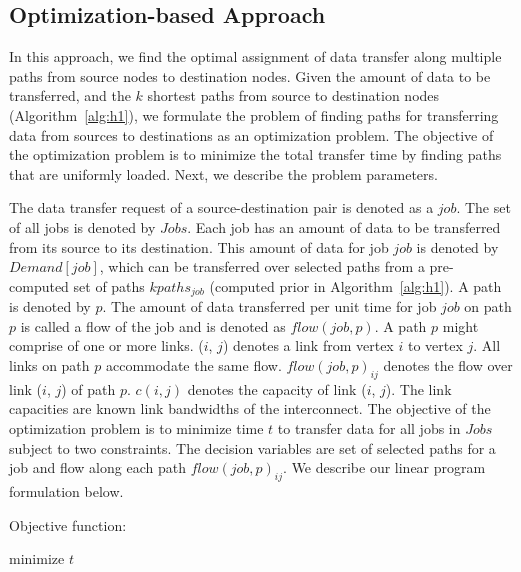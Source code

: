 \subsection{Optimization-based Approach}
\label{sec:optimization}

In this approach, we find the optimal assignment of data transfer along multiple paths from source nodes to destination nodes. Given the amount of data to be transferred, and the $k$ shortest paths from source to destination nodes (Algorithm~\ref{alg:h1}), we formulate the problem of finding paths for transferring data from sources to destinations as an optimization problem. The objective of the optimization problem is to minimize the total transfer time by finding paths that are uniformly loaded. Next, we describe the problem parameters.

The data transfer request of a source-destination pair is denoted as a $job$. The set of all jobs is denoted by $Jobs$. Each job has an amount of data to be transferred from its source to its destination. This amount of data for job $job$ is denoted by $Demand[job]$, which can be transferred over selected paths from a pre-computed set of paths $kpaths_{job}$ (computed prior in Algorithm~\ref{alg:h1}). A path is denoted by $p$. The amount of data transferred per unit time for job $job$ on path $p$ is called a flow of the job and is denoted as $flow(job, p)$. A path $p$ might comprise of one or more links. ($i$, $j$) denotes a link from vertex $i$ to vertex $j$. All links on path $p$ accommodate the same flow. $flow(job, p)_{ij}$ denotes the flow over link ($i$, $j$) of path $p$. $c(i,j)$ denotes the capacity of link ($i$, $j$). The link capacities are known link bandwidths of the interconnect. The objective of the optimization problem is to minimize time $t$ to transfer data for all jobs in $Jobs$ subject to two constraints. The decision variables are set of selected paths for a job and flow along each path $flow(job, p)_{ij}$. We describe our linear program formulation below.

Objective function:

\begin{center}
minimize $t$
\end{center}

